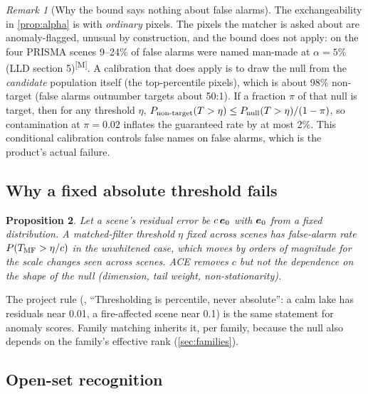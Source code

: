 \documentclass[11pt,a4paper]{article}
\theoremstyle{plain}
\newtheorem{proposition}{Proposition}[section]
\theoremstyle{definition}
\theoremstyle{remark}
\newtheorem{remark}[proposition]{Remark}
\newcommand{\ev}{\B{e}}
\newcommand{\meas}{\textsuperscript{\textsf{\scriptsize[M]}}}
\begin{document}
\begin{remark}[Why the bound says nothing about false alarms]
\label{rem:fa}
The exchangeability in \cref{prop:alpha} is with \emph{ordinary} pixels. The pixels the matcher is asked about are
anomaly-flagged, unusual by construction, and the bound does not apply: on the four PRISMA scenes 9--24\% of false alarms were
named man-made at $\alpha=5\%$ (LLD section 5)\meas. A calibration that does apply is to draw the null from the
\emph{candidate} population itself (the top-percentile pixels), which is about 98\% non-target (false alarms outnumber targets
about 50:1). If a fraction $\pi$ of that null is target, then for any threshold $\eta$,
$P_{\rm non\text{-}target}(T>\eta)\le P_{\rm null}(T>\eta)/(1-\pi)$, so contamination at $\pi=0.02$ inflates the guaranteed
rate by at most 2\%. This conditional calibration controls false names on false alarms, which is the product's actual failure.
\end{remark}

\subsection{Why a fixed absolute threshold fails}

\begin{proposition}
Let a scene's residual error be $c\,\ev_0$ with $\ev_0$ from a fixed distribution. A matched-filter threshold $\eta$ fixed across
scenes has false-alarm rate $P(T_{\rm MF}>\eta/c)$ in the unwhitened case, which moves by orders of magnitude for the scale
changes seen across scenes. ACE removes $c$ but not the dependence on the shape of the null (dimension, tail weight,
non-stationarity).
\end{proposition}

The project rule (, ``Thresholding is percentile, never absolute'': a calm lake has residuals near 0.01,
a fire-affected scene near 0.1) is the same statement for anomaly scores. Family matching inherits it, per family, because
the null also depends on the family's effective rank (\cref{sec:families}).

\subsection{Open-set recognition}
\end{document}
